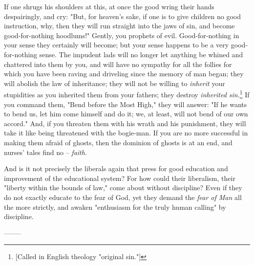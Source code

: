 \documentclass[a4paper]{book}
\begin{document}
If one shrugs his shoulders at this, at once the good wring their hands 
despairingly, and cry: "{}But, for heaven's sake, if one is to give children 
no good instruction, why, then they will run straight into the jaws of sin, 
and become good-for-nothing hoodlums!"{} Gently, you prophets of evil. 
Good-for-nothing in your sense they certainly will become; but your sense 
happens to be a very good-for-nothing sense. The impudent lads will no longer 
let anything be whined and chattered into them by you, and will have no 
sympathy for all the follies for which you have been raving and driveling 
since the memory of man began; they will abolish the law of inheritance; they 
will not be willing to \textit{inherit} your stupidities as you inherited them 
from your fathers; they destroy \textit{inherited sin}.\footnote{[Called in 
English theology "{}original sin."{}]} If you command them, "{}Bend before the 
Most High,"{} they will answer: "{}If he wants to bend us, let him come 
himself and do it; we, at least, will not bend of our own accord."{} And, if 
you threaten them with his wrath and his punishment, they will take it like 
being threatened with the bogie-man. If you are no more successful in making 
them afraid of ghosts, then the dominion of ghosts is at an end, and nurses' 
tales find no -- \textit{faith}.

And is it not precisely the liberals again that press for good education and 
improvement of the educational system? For how could their liberalism, their 
"{}liberty within the bounds of law,"{} come about without discipline? Even if 
they do not exactly educate to the fear of God, yet they demand the 
\textit{fear of Man} all the more strictly, and awaken "{}enthusiasm for the 
truly human calling"{} by discipline.

\begin{center}
--------\end{center}
\end{document}
